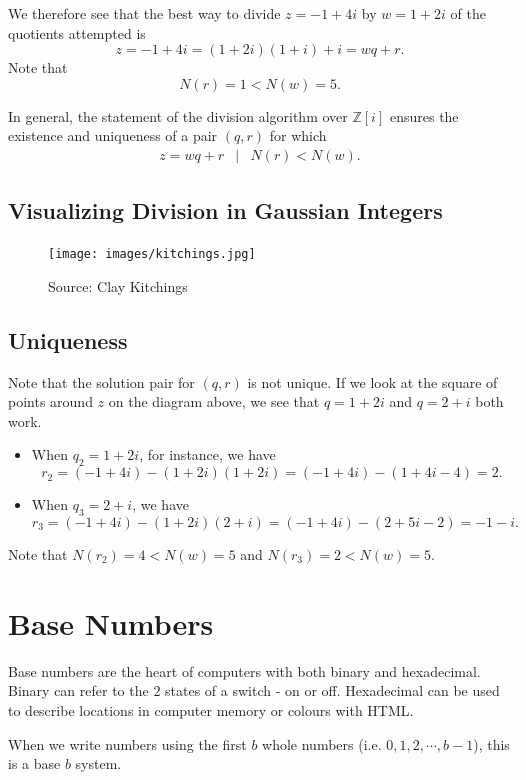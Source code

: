 We therefore see that the best way to divide $z=-1+4i$ by $w=1+2i$ of the quotients attempted is $$z=-1+4i=(1+2i)(1+i)+i=wq+r.$$  Note that $$N(r)=1<N(w)=5.$$  

In general, the statement of the division algorithm over $\mathbb{Z}[i]$ ensures the existence and uniqueness of a pair $(q,r)$ for which  \begin{eqnarray*} z=wq+r &|& N(r)<N(w). \end{eqnarray*} 

\subsection{Visualizing Division in Gaussian Integers}

\begin{figure}[H]
	\centering\texttt{[image: images/kitchings.jpg]}
	\caption{Source:  Clay Kitchings \cite{div:1}}
\end{figure}

\subsection{Uniqueness} 

Note that the solution pair for $(q,r)$ is not unique. If we look at the square of points around $z$ on the diagram above, we see that $q=1+2i$ and $q=2+i$ both work.
\begin{itemize}
	\item When $q_2=1+2i$, for instance, we have $$r_2=(-1+4i)-\left(1+2i\right)\left(1+2i\right)=(-1+4i)-\left(1+4i-4\right)=2.$$
	\item When $q_3=2+i$, we have $$r_3=(-1+4i)-\left(1+2i\right)\left(2+i\right)=(-1+4i)-(2+5i-2)=-1-i.$$
\end{itemize}
Note that $N(r_2)=4<N(w)=5$ and $N(r_3)=2<N(w)=5$.

\clearpage

\section{Base Numbers}

Base numbers are the heart of computers with both binary and hexadecimal. Binary can refer to the $2$ states of a switch - on or off. Hexadecimal can be used to describe locations in computer memory or colours with HTML.  

\begin{defi} When we write numbers using the first $b$ whole numbers (i.e. $0, 1, 2, \cdots, b-1$), this is a base $b$ system.  \cite{aops:1} \end{defi}

